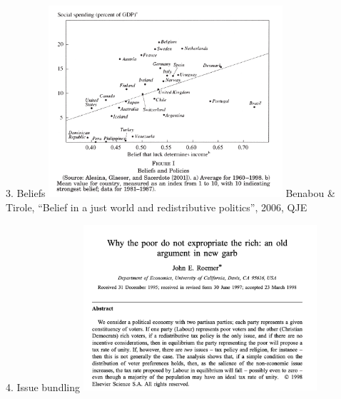 \documentclass[aspectratio=169]{beamer}
\begin{document}
\begin{frame}{3. Beliefs}
\centering
\includegraphics[width=0.65\textwidth]{benabou.png}
\footnotesize \newline  Benabou \& Tirole, ``Belief in a just world and redistributive politics'', 2006, QJE
\end{frame}

\begin{frame}{4. Issue bundling}
\centering
\includegraphics[width=0.65\textwidth]{roemer.png}
\end{frame}
\end{document}
